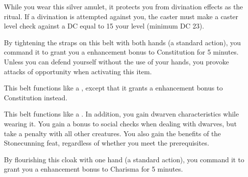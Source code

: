 
 While you wear this silver amulet, it protects you from divination effects as the  ritual. If a divination is attempted against you, the caster must make a caster level check against a DC equal to 15 \add your level (minimum DC 23).


 By tightening the straps on this belt with both hands (a standard action), you command it to grant you a  enhancement bonus to Constitution for 5 minutes. Unless you can defend yourself without the use of your hands, you provoke attacks of opportunity when activating this item.


 This belt functions like a , except that it grants a  enhancement bonus to Constitution instead.


 This belt functions like a . In addition, you gain dwarven characteristics while wearing it. You gain a  bonus to social checks when dealing with dwarves, but take a  penalty with all other creatures. You also gain the benefits of the Stonecunning feat, regardless of whether you meet the prerequisites.


 By flourishing this cloak with one hand (a standard action), you command it to grant you a  enhancement bonus to Charisma for 5 minutes.

